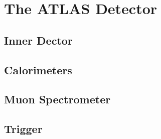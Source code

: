 \chapter{The ATLAS Detector}
\label{sec:atlas}



\cite{ATLAS}


\section{Inner Dector}
\section{Calorimeters }
\section{Muon Spectrometer}
\section{Trigger}

